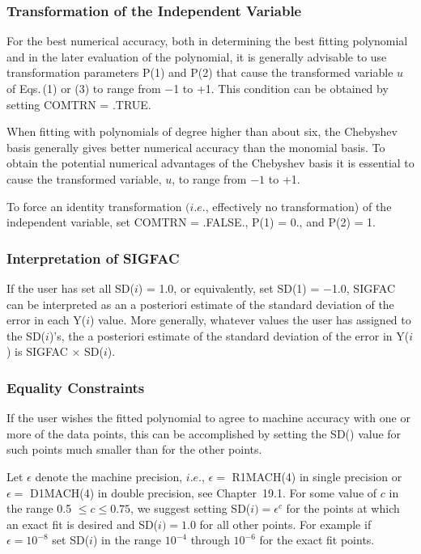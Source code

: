 \documentclass[twoside]{MATH77}
\begin{document}
\subsubsection{Transformation of the Independent Variable}

For the best numerical accuracy, both in determining the best fitting
polynomial and in the later evaluation of the polynomial, it is generally
advisable to use transformation parameters P(1) and P(2) that cause the
transformed variable $u$ of Eqs.\,(1) or (3) to range from $-$1 to +1. This
condition can be obtained by setting COMTRN = .TRUE.

When fitting with polynomials of degree higher than about six, the Chebyshev
basis generally gives better numerical accuracy than the monomial basis. To
obtain the potential numerical advantages of the Chebyshev basis it is
essential to cause the transformed variable, $u$, to range from $-1$ to +1.

To force an identity transformation $(i.e.$, effectively no transformation)
of the independent variable, set COMTRN = .FALSE., P(1) = 0., and P(2) = 1.

\subsubsection{Interpretation of SIGFAC}

If the user has set all SD($i$) = 1.0, or equivalently, set SD(1) = $-$1.0,
SIGFAC can be interpreted as an a posteriori estimate of the standard
deviation of the error in each Y($i$) value. More generally, whatever values
the user has assigned to the SD($i$)'s, the a posteriori estimate of the
standard deviation of the error in Y($i$) is SIGFAC $\times $ SD($i$).

\subsubsection{Equality Constraints}

If the user wishes the fitted polynomial to agree to machine accuracy with
one or more of the data points, this can be accomplished by setting the SD()
value for such points much smaller than for the other points.

Let $\epsilon $ denote the machine precision, $i.e.$, $\epsilon =$
R1MACH(4) in single precision or $\epsilon =$ D1MACH(4) in double
precision, see Chapter~19.1.  For some value of $c$
in the range 0.5 $\leq c \leq 0.75$, we suggest setting SD($i) = \epsilon
^c$ for the points at which an exact fit is desired and SD($i) = 1.0$ for
all other points. For example if $\epsilon = 10^{-8}$ set SD($i$) in the
range $10^{-4}$ through $10^{-6}$ for the exact fit points.
\end{document}
